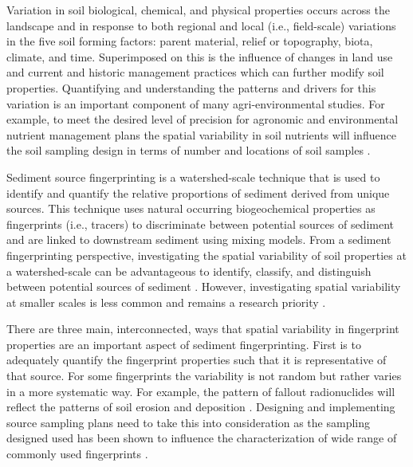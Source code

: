 \documentclass[
  number]{elsarticle}
\begin{document}
Variation in soil biological, chemical, and physical properties occurs
across the landscape and in response to both regional and local (i.e.,
field-scale) variations in the five soil forming factors: parent
material, relief or topography, biota, climate, and time. Superimposed
on this is the influence of changes in land use and current and historic
management practices which can further modify soil properties.
Quantifying and understanding the patterns and drivers for this
variation is an important component of many agri-environmental studies.
For example, to meet the desired level of precision for agronomic and
environmental nutrient management plans the spatial variability in soil
nutrients will influence the soil sampling design in terms of number and
locations of soil samples \citep{starr1995, kariuki2009}.

Sediment source fingerprinting is a watershed-scale technique that is
used to identify and quantify the relative proportions of sediment
derived from unique sources. This technique uses natural occurring
biogeochemical properties as fingerprints (i.e., tracers) to
discriminate between potential sources of sediment and are linked to
downstream sediment using mixing models. From a sediment fingerprinting
perspective, investigating the spatial variability of soil properties at
a watershed-scale can be advantageous to identify, classify, and
distinguish between potential sources of sediment \citep{pulley2017}.
However, investigating spatial variability at smaller scales is less
common \citep[e.g.,][]{du2017, pulley2018, collins2019, lunamiño2024}
and remains a research priority \citep{collins2020}.

There are three main, interconnected, ways that spatial variability in
fingerprint properties are an important aspect of sediment
fingerprinting. First is to adequately quantify the fingerprint
properties such that it is representative of that source. For some
fingerprints the variability is not random but rather varies in a more
systematic way. For example, the pattern of fallout radionuclides will
reflect the patterns of soil erosion and deposition
\citep{wilkinson2015}. Designing and implementing source sampling plans
need to take this into consideration as the sampling designed used has
been shown to influence the characterization of wide range of commonly
used fingerprints \citep{lunamiño2024}.
\end{document}
